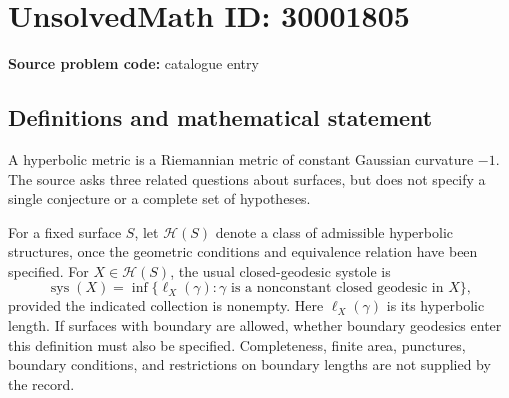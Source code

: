 \documentclass[11pt]{article}
\begin{document}
\section*{UnsolvedMath ID: 30001805}
\textbf{Source problem code:} catalogue entry
\subsection{Definitions and mathematical statement}
A hyperbolic metric is a Riemannian metric of constant Gaussian curvature \(-1\). The source asks three related questions about surfaces, but does not specify a single conjecture or a complete set of hypotheses.

For a fixed surface \(S\), let \(\mathcal H(S)\) denote a class of admissible hyperbolic structures, once the geometric conditions and equivalence relation have been specified. For \(X\in\mathcal H(S)\), the usual closed-geodesic systole is
\[
\operatorname{sys}(X)=\inf\{\ell_X(\gamma):\gamma\text{ is a nonconstant closed geodesic in }X\},
\]
provided the indicated collection is nonempty. Here \(\ell_X(\gamma)\) is its hyperbolic length. If surfaces with boundary are allowed, whether boundary geodesics enter this definition must also be specified. Completeness, finite area, punctures, boundary conditions, and restrictions on boundary lengths are not supplied by the record.
\end{document}
